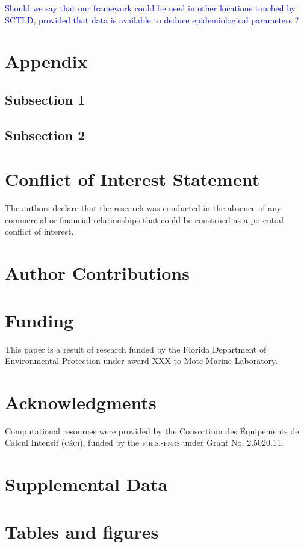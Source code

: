 \documentclass[utf8]{frontiersSCNS}
\begin{document}
\textcolor{blue}{Should we say that our framework could be used in other locations touched by SCTLD, provided that data is available to deduce epidemiological parameters ?}

\section*{Appendix}

\subsection*{Subsection 1}
\subsection*{Subsection 2}

\section*{Conflict of Interest Statement}
The authors declare that the research was conducted in the absence of any commercial or financial relationships that could be construed as a potential conflict of interest.

\section*{Author Contributions}
  
\section*{Funding}
This paper is a result of research funded by the Florida Department of Environmental Protection under award XXX to Mote Marine Laboratory. 

\section*{Acknowledgments}
Computational resources were provided by the Consortium des \'Equipements de Calcul Intensif (\textsc{c\'eci}), funded by the \textsc{f.r.s.-fnrs} under Grant No. 2.5020.11.

\section*{Supplemental Data}

 



\section*{Tables and figures}
\end{document}
